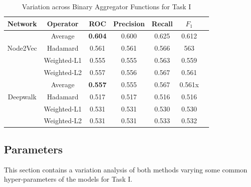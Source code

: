 \documentclass[sigconf]{acmart}
\begin{document}
\begin{table}[h]
\begin{center}
\begin{tabular}{ c|c|c|c|c|c|c } 
\textbf{Network} & \textbf{Operator} & \textbf{ROC} & \textbf{Precision} & \textbf{Recall} & \textbf{$F_{1}$} \\ 
\hline
& Average & \textbf{0.604} & 0.600 & 0.625 & 0.612  \\ 
Node2Vec & Hadamard & 0.561 & 0.561 & 0.566 & 563  \\ 
& Weighted-L1 & 0.555 & 0.555 & 0.563 & 0.559  \\ 
& Weighted-L2 & 0.557 & 0.556 & 0.567 & 0.561  \\ 
\hline
& Average & \textbf{0.557} & 0.555 & 0.567 & 0.561x  \\
Deepwalk& Hadamard &  0.517 & 0.517 & 0.516 & 0.516  \\
& Weighted-L1 & 0.531 & 0.531 & 0.530 & 0.530  \\
& Weighted-L2 & 0.531 & 0.531 & 0.533 & 0.532
\end{tabular}
\end{center}
\caption{Variation across Binary Aggregator Functions for Task I}
\label{tab:res4.1}
\end{table}
\newpage

\subsection{Parameters}
This section contains a variation analysis of both methods varying some common hyper-parameters of the models for Task I. \\
\end{document}
